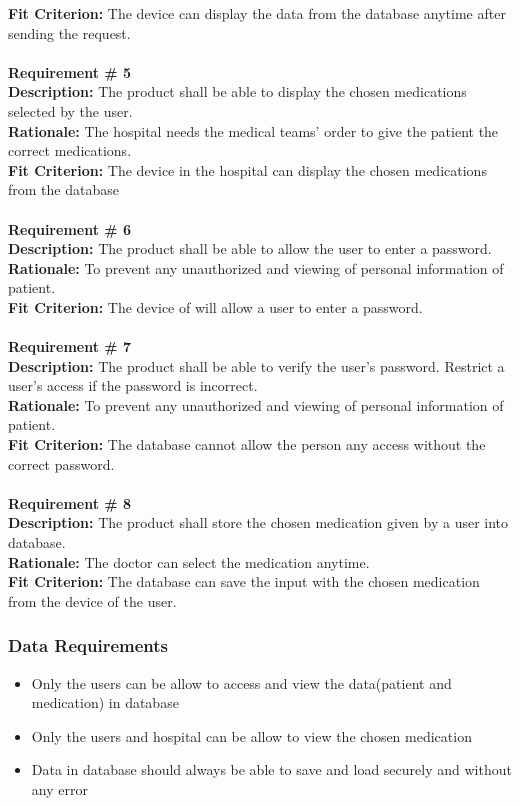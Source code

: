 \documentclass[12pt]{article}
\begin{document}
{\bf Fit Criterion:} The device can display the data from the database anytime after sending the request. \\ \\
{\bf Requirement \# 5}\\
{\bf Description:} The product shall be able to display the chosen medications selected by the user.\\
{\bf Rationale:} The hospital needs the medical teams’ order to give the patient the correct medications.\\
{\bf Fit Criterion:}  The device in the hospital can display the chosen medications from the database \\ \\
{\bf Requirement \# 6}\\
{\bf Description:} The product shall be able to allow the user to enter a password.  \\
{\bf Rationale:} To prevent any unauthorized and viewing of personal information of patient. \\
{\bf Fit Criterion:} The device of will allow a user to enter a password.\\ \\
{\bf Requirement \# 7}\\
{\bf Description:} The product shall be able to verify the user’s password. Restrict a user’s access if the password is incorrect.\\
{\bf Rationale:} To prevent any unauthorized and viewing of personal information of patient.\\
{\bf Fit Criterion:} The database cannot allow the person any access without the correct password.\\ \\
{\bf Requirement \# 8}\\
{\bf Description:} The product shall store the chosen medication given by a user into database.  \\
{\bf Rationale:} The doctor can select the medication anytime.\\
{\bf Fit Criterion:} The database can save the input with the chosen medication from the device of the user.


\subsubsection{Data Requirements}
\begin{itemize}
\item Only the users can be allow to access and view the data(patient and medication) in database
\item Only the users and hospital can be allow to view the chosen medication
\item Data in database should always be able to save and load securely and without any error 
\end{itemize}
\end{document}
